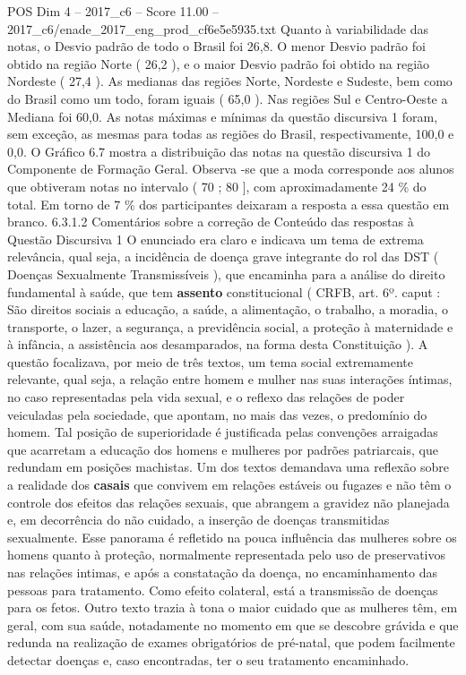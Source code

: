 \begin{textsample}{POS Dim 4 – 2017\_c6 – Score 11.00 – 2017\_c6/enade\_2017\_eng\_prod\_cf6e5e5935.txt}
Quanto à variabilidade das notas, o Desvio padrão de todo o Brasil foi 26,8.
O menor Desvio padrão foi obtido na região Norte ( 26,2 ), e o maior Desvio padrão foi obtido na região Nordeste ( 27,4 ).
As medianas das regiões Norte, Nordeste e Sudeste, bem como do Brasil como um todo, foram iguais ( 65,0 ).
Nas regiões Sul e Centro-Oeste a Mediana foi 60,0.
As notas máximas e mínimas da questão discursiva 1 foram, sem exceção, as mesmas para todas as regiões do Brasil, respectivamente, 100,0 e 0,0.
O Gráfico 6.7 mostra a distribuição das notas na questão discursiva 1 do Componente de Formação Geral.
Observa -se que a moda corresponde aos alunos que obtiveram notas no intervalo ( 70 ; 80 ], com aproximadamente 24 \% do total.
Em torno de 7 \% dos participantes deixaram a resposta a essa questão em branco. 6.3.1.2 Comentários sobre a correção de Conteúdo das respostas à Questão Discursiva 1 O enunciado era claro e indicava um tema de extrema relevância, qual seja, a incidência de doença grave integrante do rol das DST ( Doenças Sexualmente Transmissíveis ), que encaminha para a análise do direito fundamental à saúde, que tem \textbf{assento} constitucional ( CRFB, art. 6º. caput : São direitos sociais a educação, a saúde, a alimentação, o trabalho, a moradia, o transporte, o lazer, a segurança, a previdência social, a proteção à maternidade e à infância, a assistência aos desamparados, na forma desta Constituição ).
A questão focalizava, por meio de três textos, um tema social extremamente relevante, qual seja, a relação entre homem e mulher nas suas interações íntimas, no caso representadas pela vida sexual, e o reflexo das relações de poder veiculadas pela sociedade, que apontam, no mais das vezes, o predomínio do homem.
Tal posição de superioridade é justificada pelas convenções arraigadas que acarretam a educação dos homens e mulheres por padrões patriarcais, que redundam em posições machistas.
Um dos textos demandava uma reflexão sobre a realidade dos \textbf{casais} que convivem em relações estáveis ou fugazes e não têm o controle dos efeitos das relações sexuais, que abrangem a gravidez não planejada e, em decorrência do não cuidado, a inserção de doenças transmitidas sexualmente.
Esse panorama é refletido na pouca influência das mulheres sobre os homens quanto à proteção, normalmente representada pelo uso de preservativos nas relações intimas, e após a constatação da doença, no encaminhamento das pessoas para tratamento.
Como efeito colateral, está a transmissão de doenças para os fetos.
Outro texto trazia à tona o maior cuidado que as mulheres têm, em geral, com sua saúde, notadamente no momento em que se descobre grávida e que redunda na realização de exames obrigatórios de pré-natal, que podem facilmente detectar doenças e, caso encontradas, ter o seu tratamento encaminhado.

\end{textsample}
